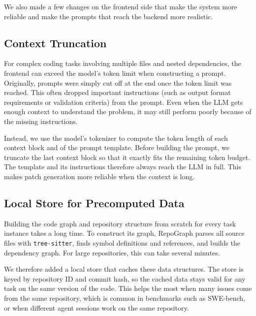 We also made a few changes on the frontend side that make the system more reliable and make the prompts that reach the backend more realistic.

\subsection{Context Truncation}
\label{sec:context_truncation}

For complex coding tasks involving multiple files and nested dependencies, the frontend can exceed the model's token limit when constructing a prompt. Originally, prompts were simply cut off at the end once the token limit was reached. This often dropped important instructions (such as output format requirements or validation criteria) from the prompt. Even when the LLM gets enough context to understand the problem, it may still perform poorly because of the missing instructions.

Instead, we use the model's tokenizer to compute the token length of each context block and of the prompt template. Before building the prompt, we truncate the last context block so that it exactly fits the remaining token budget. The template and its instructions therefore always reach the LLM in full. This makes patch generation more reliable when the context is long.

\subsection{Local Store for Precomputed Data}
\label{sec:local_store}

Building the code graph and repository structure from scratch for every task instance takes a long time. To construct its graph, RepoGraph parses all source files with \texttt{tree-sitter}, finds symbol definitions and references, and builds the dependency graph. For large repositories, this can take several minutes.

We therefore added a local store that caches these data structures. The store is keyed by repository ID and commit hash, so the cached data stays valid for any task on the same version of the code. This helps the most when many issues come from the same repository, which is common in benchmarks such as SWE-bench, or when different agent sessions work on the same repository.
